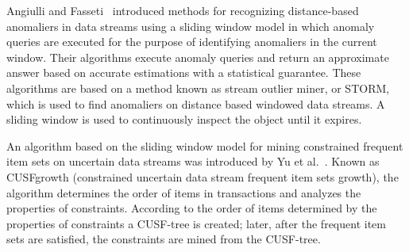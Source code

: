 Angiulli and Fasseti~\cite{angiulli2007detecting}
introduced methods for recognizing distance-based
anomaliers in data streams using a sliding window model in which
anomaly queries are executed for the purpose of
identifying anomaliers in the current window.
Their algorithms
execute anomaly queries and return an approximate answer based on accurate
estimations with a statistical guarantee.
These algorithms are based on a method
known as stream outlier miner,
or STORM,
which is used to find anomaliers on distance based
windowed data streams.
A sliding window is used to continuously inspect the
object until it expires.

An algorithm based on the sliding window model for
mining constrained frequent
item sets on uncertain data streams was introduced by
Yu et al.~\cite{yu2016uncertain}.
Known as CUSFgrowth
(constrained uncertain data stream frequent item sets growth),
the algorithm
determines the order of items in transactions and
analyzes the properties of constraints.
According to the order of items determined by
the properties of constraints a CUSF-tree
is created; later,
after the frequent item sets are satisfied,
the constraints are mined from
the CUSF-tree.


